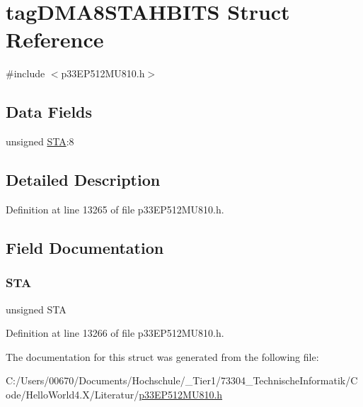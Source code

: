 \hypertarget{structtag_d_m_a8_s_t_a_h_b_i_t_s}{}\section{tag\+D\+M\+A8\+S\+T\+A\+H\+B\+I\+TS Struct Reference}
\label{structtag_d_m_a8_s_t_a_h_b_i_t_s}


{\ttfamily \#include $<$p33\+E\+P512\+M\+U810.\+h$>$}

\subsection*{Data Fields}
\begin{DoxyCompactItemize}
\item 
unsigned \hyperlink{structtag_d_m_a8_s_t_a_h_b_i_t_s_a0eec78ddd2c12af678d5fab70fe62d14}{S\+TA}\+:8
\end{DoxyCompactItemize}


\subsection{Detailed Description}


Definition at line 13265 of file p33\+E\+P512\+M\+U810.\+h.



\subsection{Field Documentation}
\mbox{\label{structtag_d_m_a8_s_t_a_h_b_i_t_s_a0eec78ddd2c12af678d5fab70fe62d14}} 
\subsubsection{\texorpdfstring{S\+TA}{STA}}
{\footnotesize\ttfamily unsigned S\+TA}



Definition at line 13266 of file p33\+E\+P512\+M\+U810.\+h.



The documentation for this struct was generated from the following file\+:\begin{DoxyCompactItemize}
\item 
C\+:/\+Users/00670/\+Documents/\+Hochschule/\+\_\+\+Tier1/73304\+\_\+\+Technische\+Informatik/\+Code/\+Hello\+World4.\+X/\+Literatur/\hyperlink{p33_e_p512_m_u810_8h}{p33\+E\+P512\+M\+U810.\+h}\end{DoxyCompactItemize}
